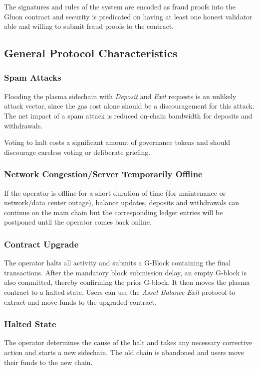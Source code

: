 \documentclass[12pt,a4paper]{article}
\begin{document}
The signatures and rules of the system are encoded as fraud proofs into the Gluon contract and security is predicated on having at least one honest validator able and willing to submit fraud proofs to the contract.

\subsection{General Protocol Characteristics}
\subsubsection{Spam Attacks}
Flooding the plasma sidechain with \emph{Deposit} and \emph{Exit} requests is an unlikely attack vector, since the gas cost alone should be a discouragement for this attack. The net impact of a spam attack is reduced on-chain bandwidth for deposits and withdrawals.

Voting to halt costs a significant amount of governance tokens and should discourage careless voting or deliberate griefing.

\subsubsection{Network Congestion/Server Temporarily Offline }
If the operator is offline for a short duration of time (for maintenance or network/data center outage), balance updates, deposits and withdrawals can continue on the main chain but the corresponding ledger entries will be postponed until the operator comes back online.

\subsubsection{Contract Upgrade}
The operator halts all activity and submits a G-Block containing the final transactions. After the mandatory block submission delay, an empty G-block is also committed, thereby confirming the prior G-block. It then moves the plasma contract to a halted state. Users can use the \emph{Asset Balance Exit} protocol to extract and move funds to the upgraded contract.

\subsubsection{Halted State}
The operator determines the cause of the halt and takes any necessary corrective action and starts a new sidechain. The old chain is abandoned and users move their funds to the new chain. 
\end{document}
